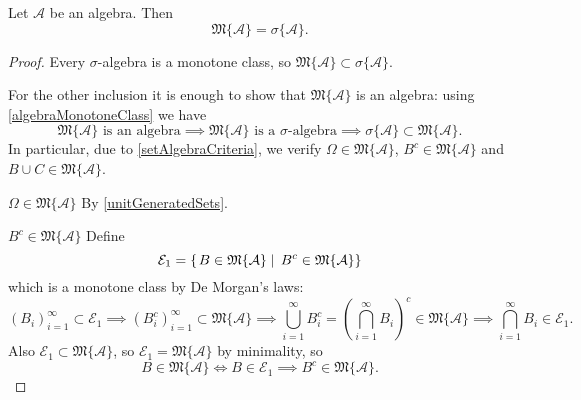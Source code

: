 \begin{proposition}
Let $\mathcal{A}$ be an algebra. Then
\[ \mathfrak{M}\{\mathcal{A}\} = \sigma\{\mathcal{A}\}. \]
\end{proposition}
\begin{proof}
Every $\sigma$-algebra is a monotone class, so $\mathfrak{M}\{\mathcal{A}\} \subset \sigma\{\mathcal{A}\}$.

For the other inclusion it is enough to show that $\mathfrak{M}\{\mathcal{A}\}$ is an algebra: using \ref{algebraMonotoneClass} we have
\[ \text{$\mathfrak{M}\{\mathcal{A}\}$ is an algebra} \implies \text{$\mathfrak{M}\{\mathcal{A}\}$ is a $\sigma$-algebra} \implies \sigma\{\mathcal{A}\}\subset\mathfrak{M}\{\mathcal{A}\}. \]
In particular, due to \ref{setAlgebraCriteria}, we verify $\Omega\in \mathfrak{M}\{\mathcal{A}\}$, $B^c \in \mathfrak{M}\{\mathcal{A}\}$ and $B\cup C \in \mathfrak{M}\{\mathcal{A}\}$.

$\boxed{\Omega\in \mathfrak{M}\{\mathcal{A}\}}$ By \ref{unitGeneratedSets}.

$\boxed{B^c \in \mathfrak{M}\{\mathcal{A}\}}$ Define
\[ \mathcal{E}_1 = \left\{\left. B\in\mathfrak{M}\{\mathcal{A}\} \;\right|\; B^c\in\mathfrak{M}\{\mathcal{A}\} \right\} \]
which is a monotone class by De Morgan's laws:
\[ (B_i)_{i=1}^\infty\subset \mathcal{E}_1 \implies (B_i^c)_{i=1}^\infty\subset \mathfrak{M}\{\mathcal{A}\} \implies \bigcup_{i=1}^\infty B_i^c = \left(\bigcap_{i=1}^\infty B_i\right)^c \in\mathfrak{M}\{\mathcal{A}\} \implies \bigcap_{i=1}^\infty B_i \in \mathcal{E}_1. \]
Also $\mathcal{E}_1\subset \mathfrak{M}\{\mathcal{A}\}$, so $\mathcal{E}_1 = \mathfrak{M}\{\mathcal{A}\}$ by minimality, so
\[ B\in\mathfrak{M}\{\mathcal{A}\} \iff B\in\mathcal{E}_1 \implies B^c\in\mathfrak{M}\{\mathcal{A}\}. \]


\end{proof}
